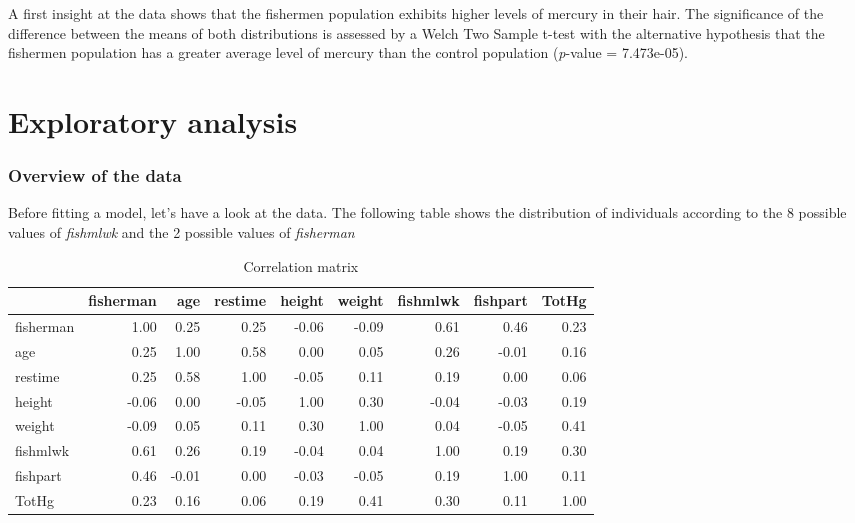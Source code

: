 \documentclass[12pt,]{article}
\begin{document}
A first insight at the data shows that the fishermen population exhibits
higher levels of mercury in their hair. The significance of the
difference between the means of both distributions is assessed by a
Welch Two Sample t-test with the alternative hypothesis that the
fishermen population has a greater average level of mercury than the
control population (\emph{p}-value = 7.473e-05).

\section{Exploratory analysis}\label{exploratory-analysis}

\subsubsection{Overview of the data}\label{overview-of-the-data}

Before fitting a model, let's have a look at the data. The following
table shows the distribution of individuals according to the 8 possible
values of \emph{fishmlwk} and the 2 possible values of \emph{fisherman}

\begin{table}[t]

\caption{\label{tab:unnamed-chunk-6}Correlation matrix}
\centering
\begin{tabular}{l|r|r|r|r|r|r|r|r}
\hline
  & fisherman & age & restime & height & weight & fishmlwk & fishpart & TotHg\\
\hline
fisherman & 1.00 & 0.25 & 0.25 & -0.06 & -0.09 & 0.61 & 0.46 & 0.23\\
\hline
age & 0.25 & 1.00 & 0.58 & 0.00 & 0.05 & 0.26 & -0.01 & 0.16\\
\hline
restime & 0.25 & 0.58 & 1.00 & -0.05 & 0.11 & 0.19 & 0.00 & 0.06\\
\hline
height & -0.06 & 0.00 & -0.05 & 1.00 & 0.30 & -0.04 & -0.03 & 0.19\\
\hline
weight & -0.09 & 0.05 & 0.11 & 0.30 & 1.00 & 0.04 & -0.05 & 0.41\\
\hline
fishmlwk & 0.61 & 0.26 & 0.19 & -0.04 & 0.04 & 1.00 & 0.19 & 0.30\\
\hline
fishpart & 0.46 & -0.01 & 0.00 & -0.03 & -0.05 & 0.19 & 1.00 & 0.11\\
\hline
TotHg & 0.23 & 0.16 & 0.06 & 0.19 & 0.41 & 0.30 & 0.11 & 1.00\\
\hline
\end{tabular}
\end{table}
\end{document}
